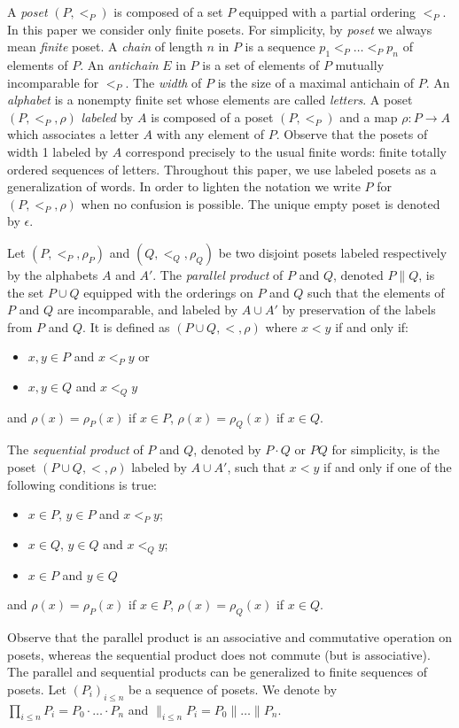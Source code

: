 \documentclass{CSML}
\begin{document}
A \emph{poset} $(P,<_P)$ is composed of a set $P$ equipped with a partial ordering $<_P$.
In this paper we consider only finite posets.
For simplicity, by \emph{poset} we always mean \emph{finite} poset.
A \emph{chain} of length $n$ in $P$ is a sequence $p_1<_P\dots<_Pp_n$ of elements of $P$.
An \emph{antichain} $E$ in $P$ is a set of elements of $P$ mutually incomparable for $<_P$.
The \emph{width} of $P$ is the size of a maximal antichain of $P$.
An \emph{alphabet} is a nonempty finite set whose elements are called \emph{letters}.
A poset $(P,<_P,\rho)$ \emph{labeled} by $A$ is composed of a poset $(P,<_P)$ and a map $\rho:P\rightarrow A$ which associates a letter $A$ with any element of $P$. 
Observe that the posets of width 1 labeled by $A$ correspond precisely to the usual finite words: finite totally ordered sequences of letters.
Throughout this paper, we use labeled posets as a generalization of words.
In order to lighten the notation we write $P$ for $(P,<_P,\rho)$ when no confusion is possible.
The unique empty poset is denoted by $\epsilon$.

Let $(P,<_P,\rho_P)$ and $(Q,<_Q,\rho_Q)$ be two disjoint posets labeled respectively by the alphabets $A$ and $A'$.
The \emph{parallel product} of $P$ and $Q$, denoted $P\parallel Q$, is the set $P\cup Q$ equipped with the orderings on $P$ and $Q$ such that the elements of $P$ and $Q$ are incomparable, and labeled by $A\cup A'$ by preservation of the labels from $P$ and $Q$. 
It is defined as $(P\cup Q,<,\rho)$ where $x< y$ if and only if:
\begin{itemize}
\item $x,y\in P$ and $x<_P y$ or
\item $x,y\in Q$ and $x<_Q y$
\end{itemize}
and $\rho(x)=\rho_P(x)$ if $x\in P$, $\rho(x)=\rho_{Q}(x)$ if $x\in Q$.

The \emph{sequential product} of $P$ and $Q$, denoted by $P\cdot Q$ or $PQ$ for simplicity, is the poset $(P\cup Q,<,\rho)$ labeled by $A\cup A'$, such that $x < y$ if and only if one of the following conditions is true:
\begin{itemize}
\item $x\in P$, $y\in P$ and $x<_P y$;
\item $x\in Q$, $y\in Q$ and $x<_Q y$;
\item $x\in P$ and $y\in Q$
\end{itemize}
and $\rho(x)=\rho_P(x)$ if $x\in P$, $\rho(x)=\rho_{Q}(x)$ if $x\in Q$.

Observe that the parallel product is an associative and commutative operation on posets, whereas the sequential product does not commute (but is associative). 
The parallel and sequential products can be generalized to finite sequences of posets. Let $(P_i)_{i\leq n}$ be a sequence of posets. We denote by $\prod_{i\leq n}P_i=P_0\cdot\dots\cdot P_n$ and $\parallel_{i\leq n}P_i=P_0\parallel\dots\parallel P_n$.
\end{document}
